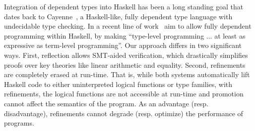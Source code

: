 %



%
%
%

%
Integration of dependent types into Haskell
has been a long standing goal that dates back
to Cayenne~\citep{cayenne}, a Haskell-like,
fully dependent type language with undecidable
type checking.
%
In a recent line of work~\citet{EisenbergS14}
aim to allow fully dependent
programming within Haskell, by making
``type-level programming ... at least as
  expressive as term-level programming''.
%
Our approach differs in two significant ways.
%
First, reflection allows SMT-aided verification,
which drastically simplifies proofs over key theories
like linear arithmetic and equality.
%
Second, refinements are completely erased at run-time.
That is, while both systems automatically lift Haskell
code to either uninterpreted logical functions
or type families, with refinements, the logical
functions are not accessible at run-time and
promotion cannot affect the semantics of
the program.
%
As an advantage (resp. disadvantage), refinements
cannot degrade (resp. optimize)
the performance of programs.


